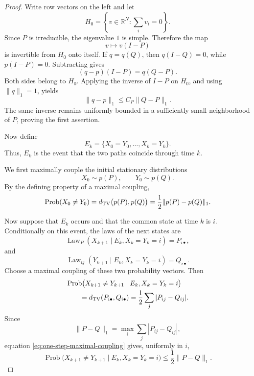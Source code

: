 \documentclass[11pt,a4paper]{amsart}
\theoremstyle{definition}
\theoremstyle{remark}
\numberwithin{equation}{section}
\newcommand{\RR}{\mathbb R}
\newcommand{\Prob}{\operatorname{Prob}}
\newcommand{\Law}{\operatorname{Law}}
\newcommand{\1}{\boldsymbol 1}
\begin{document}
\begin{proof}
Write row vectors on the left and let
$$
 H_0=\left\{v\in\RR^N:\sum_iv_i=0\right\}.
$$
Since $P$ is irreducible, the eigenvalue $1$ is simple.  Therefore
the map
$$
 v\longmapsto v(I-P)
$$
is invertible from \(H_0\) onto itself.  If $q=q(Q)$, then
$q(I-Q)=0$, while $p(I-P)=0$.  Subtracting gives
\begin{equation}\label{eq:stationary-vector-linearization}
 (q-p)(I-P)=q(Q-P).
\end{equation}
Both sides belong to $H_0$.  Applying the inverse of $I-P$ on
$H_0$, and using $\|q\|_1=1$, yields
\begin{equation}\label{eq:stationary-vector-lipschitz-expanded}
 \|q-p\|_1\le C_P\|Q-P\|_1.
\end{equation}
The same inverse remains uniformly bounded in a sufficiently small
neighborhood of $P$, proving the first assertion.


Now define
$$
 E_k=\{X_0=Y_0,\ldots,X_k=Y_k\}.
$$
Thus, $E_k$ is the event that the two paths coincide through time
$k$.

We first maximally couple the initial stationary distributions
$$
 X_0\sim p(P),
 \qquad
 Y_0\sim p(Q).
$$
By the defining property of a maximal coupling,
\begin{equation}\label{eq:initial-maximal-coupling}
 \Prob(X_0\ne Y_0)
 =
 d_{\rm TV}\bigl(p(P),p(Q)\bigr)
 =
 \frac12\|p(P)-p(Q)\|_1.
\end{equation}

Now suppose that $E_k$ occurs and that the common state at time $k$ is $i$.  Conditionally on this event, the laws of the next states are
$$
 \Law_P(X_{k+1}\mid E_k,X_k=Y_k=i)=P_{i\bullet},
$$
and
$$
 \Law_Q(Y_{k+1}\mid E_k,X_k=Y_k=i)=Q_{i\bullet}.
$$
Choose a maximal coupling of these two probability vectors.  Then
\begin{align}
 &\Prob\bigl(
   X_{k+1}\ne Y_{k+1}
   \mid E_k,X_k=Y_k=i
 \bigr)
 \notag\\
 &\qquad
 =
 d_{\rm TV}(P_{i\bullet},Q_{i\bullet})
 =
 \frac12\sum_j|P_{ij}-Q_{ij}|.
 \label{eq:one-step-maximal-coupling}
\end{align}
Since
$$
 \|P-Q\|_1
 =
 \max_i\sum_j|P_{ij}-Q_{ij}|,
$$
equation \eqref{eq:one-step-maximal-coupling} gives, uniformly in
\(i\),
\begin{equation}\label{eq:one-step-disagreement-bound}
 \Prob\bigl(
   X_{k+1}\ne Y_{k+1}
   \mid E_k,X_k=Y_k=i
 \bigr)
 \le \frac12\|P-Q\|_1.
\end{equation}


\end{proof}
\end{document}
